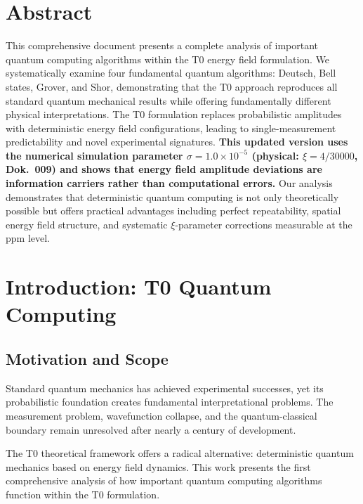 \section*{Abstract}
		This comprehensive document presents a complete analysis of important quantum computing algorithms within the T0 energy field formulation. We systematically examine four fundamental quantum algorithms: Deutsch, Bell states, Grover, and Shor, demonstrating that the T0 approach reproduces all standard quantum mechanical results while offering fundamentally different physical interpretations. The T0 formulation replaces probabilistic amplitudes with deterministic energy field configurations, leading to single-measurement predictability and novel experimental signatures. \textbf{This updated version uses the numerical simulation parameter $\sigma = 1.0 \times 10^{-5}$ (physical: $\xi = 4/30000$, Dok.~009) and shows that energy field amplitude deviations are information carriers rather than computational errors.} Our analysis demonstrates that deterministic quantum computing is not only theoretically possible but offers practical advantages including perfect repeatability, spatial energy field structure, and systematic $\xi$-parameter corrections measurable at the ppm level.

	
	
	\section{Introduction: T0 Quantum Computing}
	
	\subsection{Motivation and Scope}
	
	Standard quantum mechanics has achieved experimental successes, yet its probabilistic foundation creates fundamental interpretational problems. The measurement problem, wavefunction collapse, and the quantum-classical boundary remain unresolved after nearly a century of development.
	
	The T0 theoretical framework offers a radical alternative: deterministic quantum mechanics based on energy field dynamics. This work presents the first comprehensive analysis of how important quantum computing algorithms function within the T0 formulation.
	

